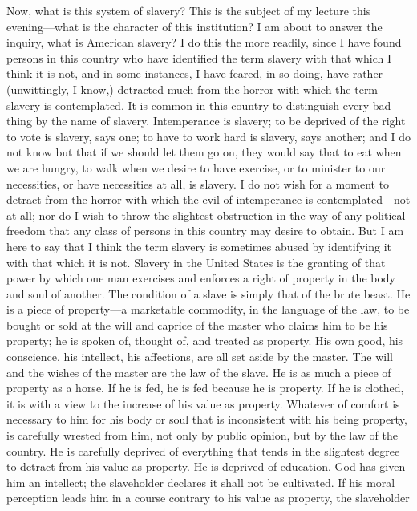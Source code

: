 {\protect\hypertarget{408}{}{}}Now, what is this system of slavery? This
is the subject of my lecture this evening---what is the character of
this institution? I am about to answer the inquiry, what is American
slavery? I do this the more readily, since I have found persons in this
country who have identified the term slavery with that which I think it
is not, and in some instances, I have feared, in so doing, have rather
(unwittingly, I know,) detracted much from the horror with which the
term slavery is contemplated. It is common in this country to
distinguish every bad thing by the name of slavery. Intemperance is
slavery; to be deprived of the right to vote is slavery, says one; to
have to work hard is slavery, says another; and I do not know but that
if we should let them go on, they would say that to eat when we are
hungry, to walk when we desire to have exercise, or to minister to our
necessities, or have necessities at all, is slavery. I do not wish for a
moment to detract from the horror with which the evil of intemperance is
contemplated---not at all; nor do I wish to throw the slightest
obstruction in the way of any political freedom that any class of
persons in this country may desire to obtain. But I am here to say that
I think the term slavery is sometimes abused by identifying it with that
which it is not. Slavery in the United States is the granting of that
power by which one man exercises and enforces a right of property in the
body and soul of another. The condition of a slave is simply that of the
brute beast. He is a piece of property---a marketable commodity, in the
language of the law, to be bought or sold at the will and caprice of the
master who claims him to be his property; he is spoken of, thought of,
and treated as property. His own good, his conscience, his intellect,
his affections, are all set aside by the master. The will and the wishes
of the master are the law of the slave. He is as much a piece of
property as a horse. If he is fed, he is fed because he is property. If
he is clothed, it is with a view to the increase of his value as
property. Whatever of comfort is necessary to him for his body or soul
that is inconsistent with his being property, is carefully wrested from
him, not only by public opinion, but by the law of the country. He is
carefully deprived of everything that tends in the slightest degree to
detract from his value as property. He is deprived of education. God has
given him an intellect; the slaveholder declares it shall not be
cultivated. If his moral perception leads him in a course contrary to
his value as {\protect\hypertarget{409}{}{}}property, the slaveholder
